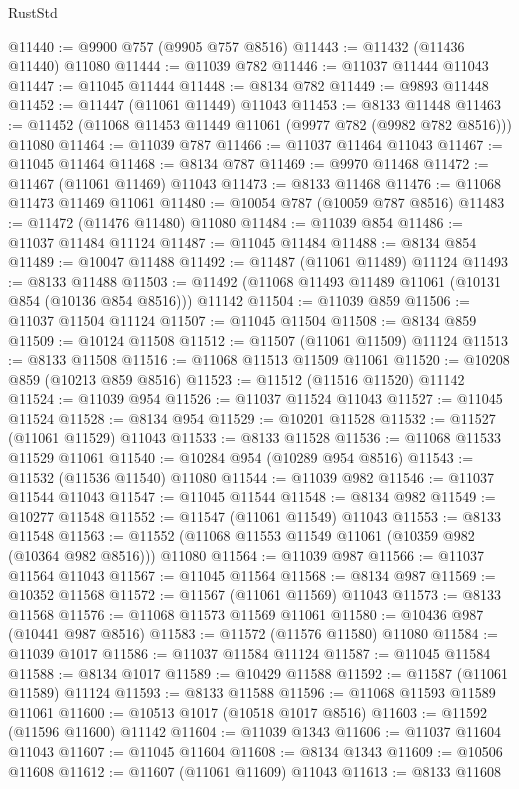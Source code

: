 \begin{lexlean}{RustStd}
\begin{coremodule}
@11440 := @9900 @757 (@9905 @757 @8516)
@11443 := @11432 (@11436 @11440) @11080
@11444 := @11039 @782
@11446 := @11037 @11444 @11043
@11447 := @11045 @11444
@11448 := @8134 @782
@11449 := @9893 @11448
@11452 := @11447 (@11061 @11449) @11043
@11453 := @8133 @11448
@11463 := @11452 (@11068 @11453 @11449 @11061 (@9977 @782 (@9982 @782 @8516))) @11080
@11464 := @11039 @787
@11466 := @11037 @11464 @11043
@11467 := @11045 @11464
@11468 := @8134 @787
@11469 := @9970 @11468
@11472 := @11467 (@11061 @11469) @11043
@11473 := @8133 @11468
@11476 := @11068 @11473 @11469 @11061
@11480 := @10054 @787 (@10059 @787 @8516)
@11483 := @11472 (@11476 @11480) @11080
@11484 := @11039 @854
@11486 := @11037 @11484 @11124
@11487 := @11045 @11484
@11488 := @8134 @854
@11489 := @10047 @11488
@11492 := @11487 (@11061 @11489) @11124
@11493 := @8133 @11488
@11503 := @11492 (@11068 @11493 @11489 @11061 (@10131 @854 (@10136 @854 @8516))) @11142
@11504 := @11039 @859
@11506 := @11037 @11504 @11124
@11507 := @11045 @11504
@11508 := @8134 @859
@11509 := @10124 @11508
@11512 := @11507 (@11061 @11509) @11124
@11513 := @8133 @11508
@11516 := @11068 @11513 @11509 @11061
@11520 := @10208 @859 (@10213 @859 @8516)
@11523 := @11512 (@11516 @11520) @11142
@11524 := @11039 @954
@11526 := @11037 @11524 @11043
@11527 := @11045 @11524
@11528 := @8134 @954
@11529 := @10201 @11528
@11532 := @11527 (@11061 @11529) @11043
@11533 := @8133 @11528
@11536 := @11068 @11533 @11529 @11061
@11540 := @10284 @954 (@10289 @954 @8516)
@11543 := @11532 (@11536 @11540) @11080
@11544 := @11039 @982
@11546 := @11037 @11544 @11043
@11547 := @11045 @11544
@11548 := @8134 @982
@11549 := @10277 @11548
@11552 := @11547 (@11061 @11549) @11043
@11553 := @8133 @11548
@11563 := @11552 (@11068 @11553 @11549 @11061 (@10359 @982 (@10364 @982 @8516))) @11080
@11564 := @11039 @987
@11566 := @11037 @11564 @11043
@11567 := @11045 @11564
@11568 := @8134 @987
@11569 := @10352 @11568
@11572 := @11567 (@11061 @11569) @11043
@11573 := @8133 @11568
@11576 := @11068 @11573 @11569 @11061
@11580 := @10436 @987 (@10441 @987 @8516)
@11583 := @11572 (@11576 @11580) @11080
@11584 := @11039 @1017
@11586 := @11037 @11584 @11124
@11587 := @11045 @11584
@11588 := @8134 @1017
@11589 := @10429 @11588
@11592 := @11587 (@11061 @11589) @11124
@11593 := @8133 @11588
@11596 := @11068 @11593 @11589 @11061
@11600 := @10513 @1017 (@10518 @1017 @8516)
@11603 := @11592 (@11596 @11600) @11142
@11604 := @11039 @1343
@11606 := @11037 @11604 @11043
@11607 := @11045 @11604
@11608 := @8134 @1343
@11609 := @10506 @11608
@11612 := @11607 (@11061 @11609) @11043
@11613 := @8133 @11608

\end{coremodule}
\end{lexlean}
